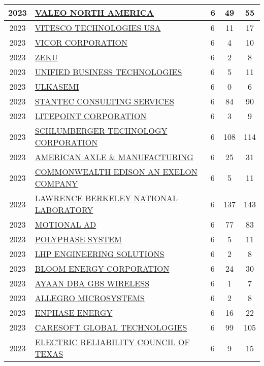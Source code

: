 \documentclass{article}%
\begin{document}
\begin{longtable}{c|p{20em}|p{5em}|c|c}
\hline%
2023&\hyperref[subsec:VALEONORTHAMERICA]{VALEO NORTH AMERICA}&6&49&55\\%
\hline%
2023&\hyperref[subsec:VITESCOTECHNOLOGIESUSA]{VITESCO TECHNOLOGIES USA}&6&11&17\\%
\hline%
2023&\hyperref[subsec:VICORCORPORATION]{VICOR CORPORATION}&6&4&10\\%
\hline%
2023&\hyperref[subsec:ZEKU]{ZEKU}&6&2&8\\%
\hline%
2023&\hyperref[subsec:UNIFIEDBUSINESSTECHNOLOGIES]{UNIFIED BUSINESS TECHNOLOGIES}&6&5&11\\%
\hline%
2023&\hyperref[subsec:ULKASEMI]{ULKASEMI}&6&0&6\\%
\hline%
2023&\hyperref[subsec:STANTECCONSULTINGSERVICES]{STANTEC CONSULTING SERVICES}&6&84&90\\%
\hline%
2023&\hyperref[subsec:LITEPOINTCORPORATION]{LITEPOINT CORPORATION}&6&3&9\\%
\hline%
2023&\hyperref[subsec:SCHLUMBERGERTECHNOLOGYCORPORATION]{SCHLUMBERGER TECHNOLOGY CORPORATION}&6&108&114\\%
\hline%
2023&\hyperref[subsec:AMERICANAXLEMANUFACTURING]{AMERICAN AXLE \& MANUFACTURING}&6&25&31\\%
\hline%
2023&\hyperref[subsec:COMMONWEALTHEDISONANEXELONCOMPANY]{COMMONWEALTH EDISON AN EXELON COMPANY}&6&5&11\\%
\hline%
2023&\hyperref[subsec:LAWRENCEBERKELEYNATIONALLABORATORY]{LAWRENCE BERKELEY NATIONAL LABORATORY}&6&137&143\\%
\hline%
2023&\hyperref[subsec:MOTIONALAD]{MOTIONAL AD}&6&77&83\\%
\hline%
2023&\hyperref[subsec:POLYPHASESYSTEM]{POLYPHASE SYSTEM}&6&5&11\\%
\hline%
2023&\hyperref[subsec:LHPENGINEERINGSOLUTIONS]{LHP ENGINEERING SOLUTIONS}&6&2&8\\%
\hline%
2023&\hyperref[subsec:BLOOMENERGYCORPORATION]{BLOOM ENERGY CORPORATION}&6&24&30\\%
\hline%
2023&\hyperref[subsec:AYAANDBAGBSWIRELESS]{AYAAN  DBA GBS WIRELESS}&6&1&7\\%
\hline%
2023&\hyperref[subsec:ALLEGROMICROSYSTEMS]{ALLEGRO MICROSYSTEMS}&6&2&8\\%
\hline%
2023&\hyperref[subsec:ENPHASEENERGY]{ENPHASE ENERGY}&6&16&22\\%
\hline%
2023&\hyperref[subsec:CARESOFTGLOBALTECHNOLOGIES]{CARESOFT GLOBAL TECHNOLOGIES}&6&99&105\\%
\hline%
2023&\hyperref[subsec:ELECTRICRELIABILITYCOUNCILOFTEXAS]{ELECTRIC RELIABILITY COUNCIL OF TEXAS}&6&9&15\\%

\end{longtable}
\end{document}
